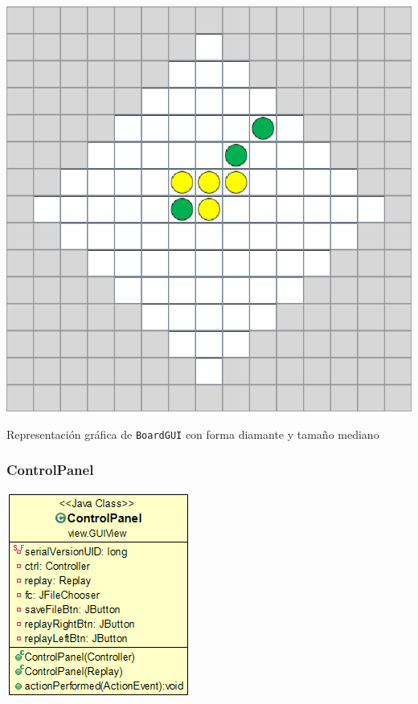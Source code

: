 \documentclass[../DocumentoOficial.tex]{subfiles}
\begin{document}
\begin{center}
\includegraphics[scale=0.8]{boardgui.png}

Representación gráfica de \texttt{BoardGUI} con forma diamante y tamaño mediano
\end{center}

\subsubsection{ControlPanel}
\begin{center}
\includegraphics[scale=0.65]{controlpaneluml.png}
\end{center}
\end{document}
